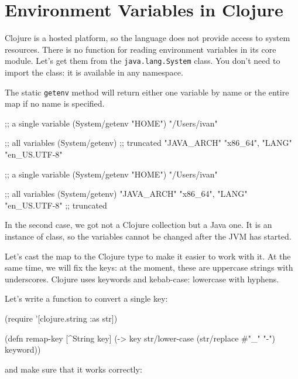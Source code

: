 \section{ Environment Variables in Clojure}


Clojure is a hosted platform, so the language does not provide access to system resources. There is no function for reading environment variables in its core module. Let's get them from the \verb|java.lang.System| class. You don't need to import the class: it is available in any namespace.

The static \verb|getenv| method will return either one variable by name or the entire map if no name is specified.

\ifnarrow

\begin{clojure}
;; a single variable
(System/getenv "HOME")
"/Users/ivan"

;; all variables
(System/getenv)
;; truncated
{"JAVA_ARCH" "x86_64",
 "LANG" "en_US.UTF-8"}
\end{clojure}

\else

\begin{clojure}
;; a single variable
(System/getenv "HOME")
"/Users/ivan"

;; all variables
(System/getenv)
{"JAVA_ARCH" "x86_64", "LANG" "en_US.UTF-8"} ;; truncated
\end{clojure}

\fi

In the second case, we got not a Clojure collection but a Java one. It is an instance of  class, so the variables cannot be changed after the JVM has started.

Let's cast the map to the Clojure type to make it easier to work with it. At the same time, we will fix the keys: at the moment, these are uppercase strings with underscores. Clojure uses keywords and kebab-case: lowercase with hyphens.

Let's write a function to convert a single key:

\begin{clojure}
(require '[clojure.string :as str])

(defn remap-key [^String key]
  (-> key
      str/lower-case
      (str/replace #"_" "-")
      keyword))
\end{clojure}

\noindent
and make sure that it works correctly:

